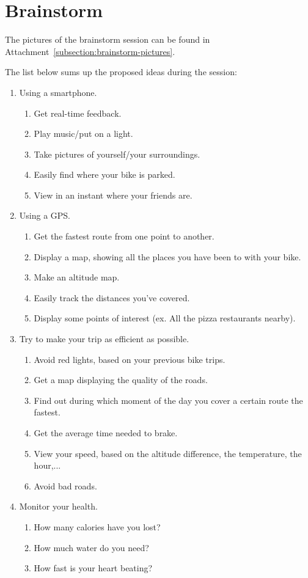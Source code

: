 \section{Brainstorm}
The pictures of the brainstorm session can be found in Attachment~\ref{subsection:brainstorm-pictures}.

The list below sums up the proposed ideas during the session:
\begin{enumerate}
 \item Using a smartphone.
  \begin{enumerate}
   \item Get real-time feedback.
   \item Play music/put on a light.
   \item Take pictures of yourself/your surroundings.
   \item Easily find where your bike is parked.
   \item View in an instant where your friends are.
  \end{enumerate}
 \item Using a GPS.
  \begin{enumerate}
   \item Get the fastest route from one point to another.
   \item Display a map, showing all the places you have been to with your bike. 
   \item Make an altitude map.
   \item Easily track the distances you've covered.
   \item Display some points of interest (ex. All the pizza restaurants nearby).
  \end{enumerate}
 \item Try to make your trip as efficient as possible.
  \begin{enumerate}
   \item Avoid red lights, based on your previous bike trips.
   \item Get a map displaying the quality of the roads.
   \item Find out during which moment of the day you cover a certain route the fastest.
   \item Get the average time needed to brake.
   \item View your speed, based on the altitude difference, the temperature, the hour,...
   \item Avoid bad roads.
  \end{enumerate}
 \item Monitor your health.
  \begin{enumerate}
   \item How many calories have you lost?
   \item How much water do you need?
   \item How fast is your heart beating?
  \end{enumerate}
\end{enumerate}


